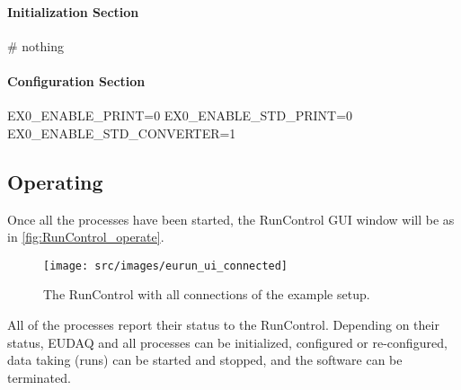\paragraph{Initialization Section}
\begin{listing}
# nothing
\end{listing}

\paragraph{Configuration Section}
\begin{listing}
EX0_ENABLE_PRINT=0
EX0_ENABLE_STD_PRINT=0
EX0_ENABLE_STD_CONVERTER=1
\end{listing}

\subsection{Operating}
Once all the processes have been started, the RunControl GUI window will be as in \autoref{fig:RunControl_operate}.
\begin{figure}[htb]
  \begin{center}
    \texttt{[image: src/images/eurun\_ui\_connected]}
    \caption{The RunControl with all connections of the example setup.}
    \label{fig:RunControl_operate}
  \end{center}
\end{figure}

All of the processes report their status to the RunControl.
Depending on their status, EUDAQ and all processes can be initialized, configured or re-configured, data taking (runs) can be started and stopped, and the software can be terminated.

